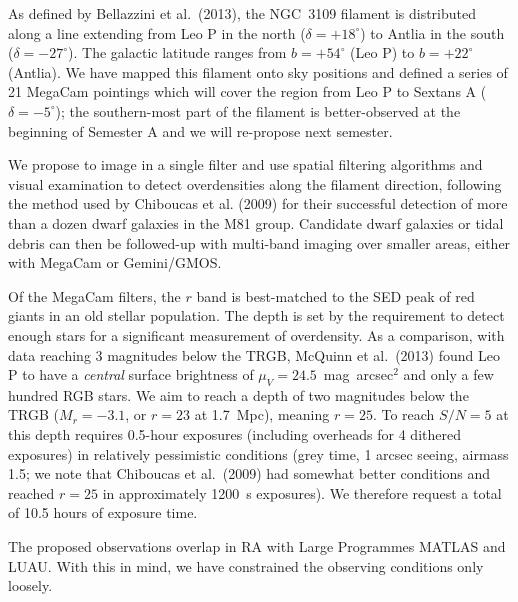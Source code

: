 As defined by Bellazzini et al.\ (2013), the NGC~3109 filament is  distributed along a line extending from Leo P in the north ($\delta = +18^{\circ}$) to
Antlia in the south ($\delta = -27^{\circ}$). The galactic latitude ranges from $b = +54^{\circ}$ (Leo P) to $b = +22^{\circ}$ (Antlia).
We have mapped this filament onto sky positions and defined a series of 21 MegaCam
pointings which will cover the region from Leo P to Sextans A  ($\delta = -5^{\circ}$); 
the southern-most part of the filament is better-observed at the beginning of Semester A and we will re-propose next semester. %

We propose to image in a single filter  and use spatial filtering algorithms and visual examination to detect overdensities along the filament direction,
following the method used by Chiboucas et al. (2009) for their successful detection of more than a dozen dwarf galaxies in the M81 group.
Candidate dwarf galaxies or tidal debris can then be followed-up with multi-band imaging over smaller areas, either with MegaCam or Gemini/GMOS.

Of the MegaCam filters, the $r$ band is best-matched to the SED peak of red giants in an old stellar population.
The depth is set by the requirement to detect enough stars for a significant measurement of overdensity. As a comparison,
with data reaching 3 magnitudes below the TRGB, McQuinn et al.\ (2013) found Leo P to have a {\em central} surface brightness of $\mu_V=24.5$~mag~arcsec$^2$ and only a few hundred RGB stars. We aim to reach 
a depth of two magnitudes below the TRGB ($M_r = -3.1$, or  $r=23$ at 1.7~Mpc), meaning $r=25$.  
To reach $S/N=5$ at this depth requires 0.5-hour exposures (including overheads for 4 dithered exposures) 
in relatively pessimistic conditions (grey time, 1 arcsec seeing, airmass 1.5; we note that Chiboucas et al.\ (2009) had somewhat
better conditions and reached $r=25$ in approximately 1200~s exposures).
We therefore request a total of 10.5 hours of exposure time.


The proposed observations  overlap in RA with Large Programmes MATLAS and LUAU. With this in mind, we have constrained the observing
conditions only loosely.

